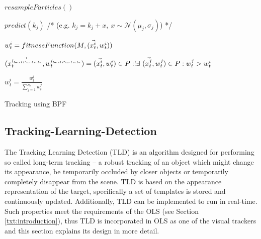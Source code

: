 \begin{algorithm}
	\SetAlgoNoLine	
	\DontPrintSemicolon
	
	\BlankLine
	
	$resampleParticles()$\;
	
	\BlankLine
	{
		{		
			$predict(k_{j})$ /* (e.g. $k_{j} = k_{j} + x, ~ x \sim \mathcal{N}(\mu_{j}, \sigma_{j})$) */ \;
		}
	}
	
	\BlankLine
	{
		$w_{t}^{i} = fitnessFunction(M, (\vec{x_{t}^{i}},w_{t}^{i}))$\;
	}
	
	\BlankLine
	$(\vec{x_{t}^{i_{bestParticle}}},w_{t}^{i_{bestParticle}}) = (\vec{x_{t}^{i}},w_{t}^{i}) \in P : !\exists ~ (\vec{x_{t}^{j}},w_{t}^{j}) \in P : w_{t}^{j} > w_{t}^{i}$\;
	
	\BlankLine	
	{
		$w_{t}^{i} = \frac{w_{t}^{i}}{\sum_{j = 1}^{n_{p}}w_{t}^{j}}$
	}
	
	
	\caption{Tracking using BPF}
	\label{alg:bpf}
\end{algorithm}

\subsection{Tracking-Learning-Detection} \label{txt:tracking_learning_detection}

The Tracking Learning Detection (TLD) \cite{Kalal:2012:TRA:2225045.2225082} is an algorithm designed for performing so called long-term tracking -- a robust tracking of an object which might change its appearance, be temporarily occluded by closer objects or temporarily completely disappear from the scene. TLD is based on the appearance representation of the target, specifically a set of templates is stored and continuously updated. Additionally, TLD can be implemented to run in real-time. Such properties meet the requirements of the OLS (see Section \ref{txt:introduction}), thus TLD is incorporated in OLS as one of the visual trackers and this section explains its design in more detail.

